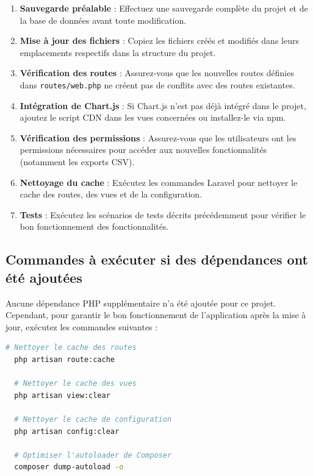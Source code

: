 \documentclass[a4paper,12pt]{report}
\begin{document}
  \begin{enumerate}
    \item \textbf{Sauvegarde préalable} : Effectuez une sauvegarde complète du projet et de la base de données avant toute modification.
    
    \item \textbf{Mise à jour des fichiers} : Copiez les fichiers créés et modifiés dans leurs emplacements respectifs dans la structure du projet.
    
    \item \textbf{Vérification des routes} : Assurez-vous que les nouvelles routes définies dans \texttt{routes/web.php} ne créent pas de conflits avec des routes existantes.
    
    \item \textbf{Intégration de Chart.js} : Si Chart.js n'est pas déjà intégré dans le projet, ajoutez le script CDN dans les vues concernées ou installez-le via npm.
    
    \item \textbf{Vérification des permissions} : Assurez-vous que les utilisateurs ont les permissions nécessaires pour accéder aux nouvelles fonctionnalités (notamment les exports CSV).
    
    \item \textbf{Nettoyage du cache} : Exécutez les commandes Laravel pour nettoyer le cache des routes, des vues et de la configuration.
    
    \item \textbf{Tests} : Exécutez les scénarios de tests décrits précédemment pour vérifier le bon fonctionnement des fonctionnalités.
  \end{enumerate}

  \subsection{Commandes à exécuter si des dépendances ont été ajoutées}
  Aucune dépendance PHP supplémentaire n'a été ajoutée pour ce projet. Cependant, pour garantir le bon fonctionnement de l'application après la mise à jour, exécutez les commandes suivantes :
  
  \begin{lstlisting}[language=bash]
  # Nettoyer le cache des routes
  php artisan route:cache
  
  # Nettoyer le cache des vues
  php artisan view:clear
  
  # Nettoyer le cache de configuration
  php artisan config:clear
  
  # Optimiser l'autoloader de Composer
  composer dump-autoload -o
  \end{lstlisting}
  
\end{document}
